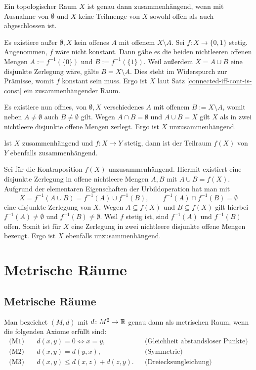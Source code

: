 \newpage
\begin{Satz}
Ein topologischer Raum $X$ ist genau dann zusammenhängend,
wenn mit Ausnahme von $\emptyset$ und $X$ keine Teilmenge
von $X$ sowohl offen als auch abgeschlossen ist.
\end{Satz}
\begin{Beweis}
Es existiere außer $\emptyset,X$ kein offenes $A$ mit offenem
$X\setminus A$. Sei $f\colon X\to\{0,1\}$ stetig. Angenommen, $f$
wäre nicht konstant. Dann gäbe es die beiden nichtleeren offenen Mengen
$A:=f^{-1}(\{0\})$ und $B:=f^{-1}(\{1\})$. Weil außerdem $X=A\cup B$
eine disjunkte Zerlegung wäre, gälte $B=X\setminus A$. Dies steht
im Widerspurch zur Prämisse, womit $f$ konstant sein muss.
Ergo ist $X$ laut Satz \ref{connected-iff-cont-is-const} ein
zusammenhängender Raum.

Es existiere nun offnes, von $\emptyset,X$ verschiedenes $A$ mit
offenem $B:=X\setminus A$, womit neben $A\ne\emptyset$ auch
$B\ne\emptyset$ gilt. Wegen $A\cap B=\emptyset$ und $A\cup B=X$
gilt $X$ als in zwei nichtleere disjunkte offene Mengen zerlegt.
Ergo ist $X$ unzusammenhängend.\,\qedsymbol
\end{Beweis}

\begin{Satz}
Ist $X$ zusammenhängend und $f\colon X\to Y$ stetig, dann
ist der Teilraum $f(X)$ von $Y$ ebenfalls zusammenhängend.
\end{Satz}
\begin{Beweis}
Sei für die Kontraposition $f(X)$ unzusammenhängend. Hiermit existiert
eine disjunkte Zerlegung in offene nichtleere Mengen $A,B$ mit
$A\cup B=f(X)$. Aufgrund der elementaren Eigenschaften der
Urbildoperation hat man mit
\[X = f^{-1}(A\cup B) = f^{-1}(A)\cup f^{-1}(B),\qquad
f^{-1}(A)\cap f^{-1}(B) = \emptyset\]
eine disjunkte Zerlegung von $X$. Wegen $A\subseteq f(X)$ und
$B\subseteq f(X)$ gilt hierbei $f^{-1}(A)\ne\emptyset$ und
$f^{-1}(B)\ne\emptyset$. Weil $f$ stetig ist, sind $f^{-1}(A)$
und $f^{-1}(B)$ offen. Somit ist für $X$ eine Zerlegung
in zwei nichtleere disjunkte offene Mengen bezeugt. Ergo ist
$X$ ebenfalls unzusammenhängend.\,\qedsymbol
\end{Beweis}


\newpage
\section{Metrische Räume}
\subsection{Metrische Räume}
\begin{Definition}%
\label{metric-space}
Man bezeichet $(M,d)$ mit $d\colon M^2\to\mathbb R$ genau dann als
metrischen Raum, wenn die folgenden Axiome erfüllt sind:
\begin{align*}
\text{(M1)}\quad & d(x,y)=0\iff x=y, &&\text{(Gleichheit abstandsloser Punkte)}\\
\text{(M2)}\quad & d(x,y)=d(y,x), &&\text{(Symmetrie)}\\
\text{(M3)}\quad & d(x,y)\le d(x,z)+d(z,y). &&\text{(Dreiecksungleichung)}
\end{align*}
\end{Definition}


